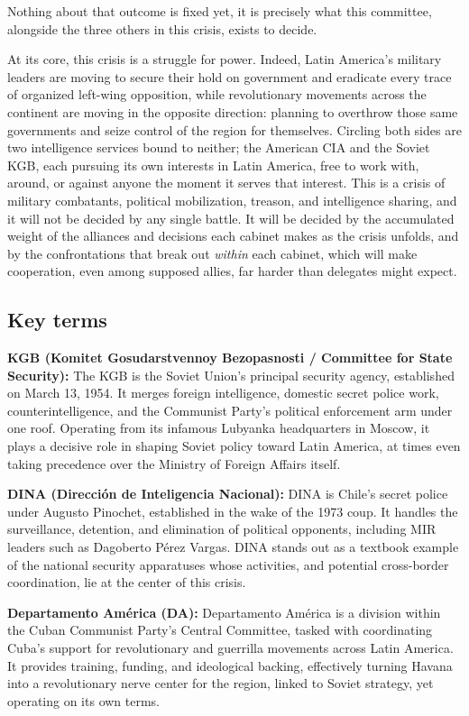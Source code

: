 Nothing about that outcome is fixed yet, it is precisely what this committee, alongside the three others in this crisis, exists to decide.

At its core, this crisis is a struggle for power. Indeed, Latin America's military leaders are moving to secure their hold on government and eradicate every trace of organized left-wing opposition, while revolutionary movements across the continent are moving in the opposite direction: planning to overthrow those same governments and seize control of the region for themselves. Circling both sides are two intelligence services bound to neither; the American CIA and the Soviet KGB,  each pursuing its own interests in Latin America, free to work with, around, or against anyone the moment it serves that interest. This is a crisis of military combatants, political mobilization, treason, and intelligence sharing, and it will not be decided by any single battle. It will be decided by the accumulated weight of the alliances and decisions each cabinet makes as the crisis unfolds, and by the confrontations that break out \emph{within} each cabinet, which will make cooperation, even among supposed allies, far harder than delegates might expect.

\subsection{Key terms}

\textbf{KGB (Komitet Gosudarstvennoy Bezopasnosti / Committee for State Security):} The KGB is the Soviet Union’s principal security agency, established on March 13, 1954. It merges foreign intelligence, domestic secret police work, counterintelligence, and the Communist Party’s political enforcement arm under one roof. Operating from its infamous Lubyanka headquarters in Moscow, it plays a decisive role in shaping Soviet policy toward Latin America, at times even taking precedence over the Ministry of Foreign Affairs itself.

\textbf{DINA (Dirección de Inteligencia Nacional):} DINA is Chile’s secret police under Augusto Pinochet, established in the wake of the 1973 coup. It handles the surveillance, detention, and elimination of political opponents, including MIR leaders such as Dagoberto Pérez Vargas. DINA stands out as a textbook example of the national security apparatuses whose activities, and potential cross-border coordination, lie at the center of this crisis.

\textbf{Departamento América (DA):} Departamento América is a division within the Cuban Communist Party’s Central Committee, tasked with coordinating Cuba’s support for revolutionary and guerrilla movements across Latin America. It provides training, funding, and ideological backing, effectively turning Havana into a revolutionary nerve center for the region, linked to Soviet strategy, yet operating on its own terms.

